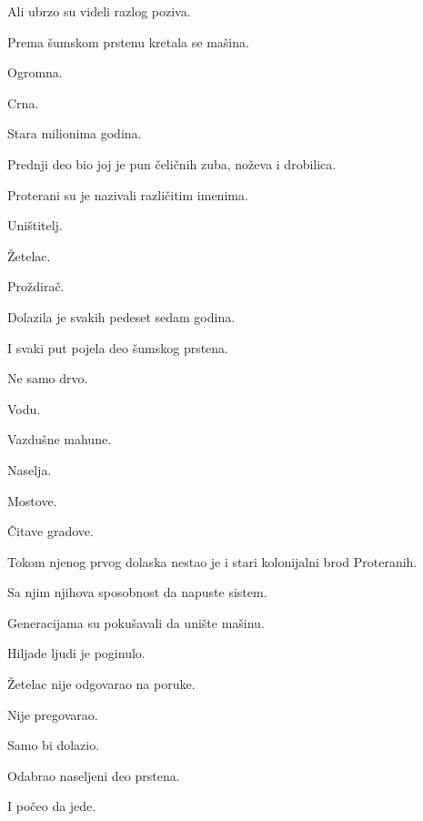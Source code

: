 Ali ubrzo su videli razlog poziva.

\bigskip

Prema šumskom prstenu kretala se mašina.

\bigskip

Ogromna.

Crna.

Stara milionima godina.

\bigskip

Prednji deo bio joj je pun čeličnih zuba, noževa i drobilica.

\bigskip

Proterani su je nazivali različitim imenima.

\bigskip

Uništitelj.

Žetelac.

Proždirač.

\bigskip

Dolazila je svakih pedeset sedam godina.

\bigskip

I svaki put pojela deo šumskog prstena.

\bigskip

Ne samo drvo.

\bigskip

Vodu.

Vazdušne mahune.

Naselja.

Mostove.

Čitave gradove.

\bigskip

Tokom njenog prvog dolaska nestao je i stari kolonijalni brod Proteranih.

\bigskip

Sa njim njihova sposobnost da napuste sistem.

\bigskip

Generacijama su pokušavali da unište mašinu.

\bigskip

Hiljade ljudi je poginulo.

\bigskip

Žetelac nije odgovarao na poruke.

\bigskip

Nije pregovarao.

\bigskip

Samo bi dolazio.

Odabrao naseljeni deo prstena.

I počeo da jede.

